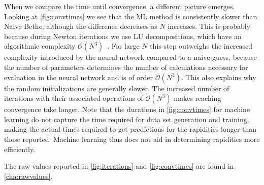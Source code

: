 \documentclass[11pt, a4paper]{report} %
\begin{document}
When we compare the time until convergence, a different picture emerges.
Looking at \cref{fig:convtimes} we see that the ML method is consistently slower than Naive Bethe, although the difference decreases as \(N\) increases.
This is probably because during Newton iterations we use LU decompositions, which have an algorithmic complexity \(\mathcal{O}(N^3)\)~\cite{Press2007}.
For large \(N\) this step outweighs the increased complexity introduced by the neural network compared to a naive guess, because the number of parameters determines the number of calculations necessary for evaluation in the neural network and is of order \(\mathcal{O}(N^2)\).
This also explains why the random initializations are generally slower. 
The increased number of iterations with their associated operations of \(\mathcal{O}(N^3)\) makes reaching convergence take longer.
Note that the durations in \cref{fig:convtimes} for machine learning do not capture the time required for data set generation and training, making the actual times required to get predictions for the rapidities longer than those reported.
Machine learning thus does not aid in determining rapidities more efficiently.

The raw values reported in \cref{fig:iterations} and \cref{fig:convtimes} are found in \cref{cha:rawvalues}.
\end{document}
